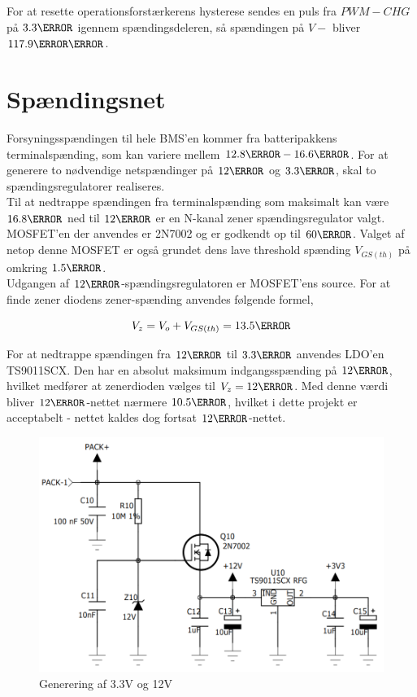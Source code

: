 For at resette operationsforstærkerens hysterese sendes en puls fra $PWM-CHG$ på $3.3\volt$ igennem spændingsdeleren, så spændingen på $V-$ bliver $117.9\milli\volt$.


\section{Spændingsnet}\label{afs:voltagenet}
Forsyningsspændingen til hele BMS'en kommer fra batteripakkens terminalspænding, som kan variere mellem $12.8\volt - 16.6\volt$. For at generere to nødvendige netspændinger på $12\volt$ og $3.3\volt$, skal to spændingsregulatorer realiseres.
\\

Til at nedtrappe spændingen fra terminalspænding som maksimalt kan være $16.8\volt$ ned til $12\volt$ er en N-kanal zener spændingsregulator valgt. MOSFET'en der anvendes er 2N7002 og er godkendt op til $60\volt$. Valget af netop denne MOSFET er også grundet dens lave threshold spænding $V_{GS(th)}$ på omkring  $1.5\volt$.
\\


Udgangen af $12\volt$-spændingsregulatoren er MOSFET'ens source. For at finde zener diodens zener-spænding anvendes følgende formel,

\begin {equation} 
V_{z} = V_{o} + V_{GS(th)} = 13.5\volt
\end {equation}

For at nedtrappe spændingen fra $12\volt$ til $3.3\volt$ anvendes LDO'en TS9011SCX. Den har en absolut maksimum indgangsspænding på $12\volt$, hvilket medfører at zenerdioden vælges til $V_{z}=12\volt$. Med denne værdi bliver $12\volt$-nettet nærmere $10.5\volt$, hvilket i dette projekt er acceptabelt - nettet kaldes dog fortsat $12\volt$-nettet.

\begin{figure}[h]
	\centering
	\includegraphics[width=12cm]{billeder/voltage_nets.png}
	\caption{Generering af 3.3V og 12V}
	\label{fig:voltage_nets}
\end{figure}

